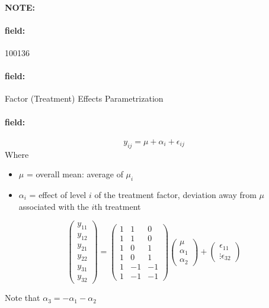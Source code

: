 \documentclass[12pt]{article}
\newenvironment{note}{\paragraph{NOTE:}}{}
\newenvironment{field}{\paragraph{field:}}{}
\begin{document}
\begin{note}
    \begin{field}
        \tiny 100136
    \end{field}
    \begin{field}
        Factor (Treatment) Effects Parametrization
    \end{field}
    \begin{field}
      $$ y_{ij} = \mu + \alpha_i + \epsilon_{ij}$$
      Where
      \begin{itemize}
        \item $\mu$ = overall mean: average of $\mu_i$
        \item $\alpha_i$ = effect of level $i$ of the treatment factor, deviation away from $\mu$ associated with the $i$th treatment
      \end{itemize}

      $$ \begin{pmatrix}
            y_{11} \\ y_{12} \\ y_{21} \\ y_{22} \\ y_{31} \\y_{32}
      \end{pmatrix}  = \begin{pmatrix}
            1 & 1 & 0 \\
            1 & 1 & 0 \\
            1 & 0 & 1 \\
            1 & 0 & 1 \\
            1 & -1 & -1 \\
            1 & -1 & -1
      \end{pmatrix} \begin{pmatrix}
            \mu \\ \alpha_1 \\ \alpha_2
      \end{pmatrix} + \begin{pmatrix}
            \epsilon_{11} \\ \vdots \epsilon_{32}
      \end{pmatrix} $$

      Note that $\alpha_3 = -\alpha_1 - \alpha_2$
    \end{field}
\end{note}
\end{document}
